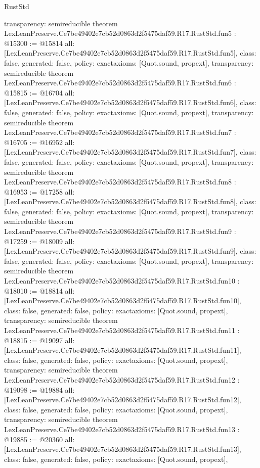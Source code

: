 \begin{lexlean}{RustStd}
\begin{coremodule}
{  transparency: semireducible
}
theorem LexLeanPreserve.Ce7be49402e7cb52d0863d2f5475daf59.R17.RustStd.fun5 : @15300 := @15814 {
  all: [LexLeanPreserve.Ce7be49402e7cb52d0863d2f5475daf59.R17.RustStd.fun5],
  class: false,
  generated: false,
  policy: exact{axioms: [Quot.sound, propext]},
  transparency: semireducible
}
theorem LexLeanPreserve.Ce7be49402e7cb52d0863d2f5475daf59.R17.RustStd.fun6 : @15815 := @16704 {
  all: [LexLeanPreserve.Ce7be49402e7cb52d0863d2f5475daf59.R17.RustStd.fun6],
  class: false,
  generated: false,
  policy: exact{axioms: [Quot.sound, propext]},
  transparency: semireducible
}
theorem LexLeanPreserve.Ce7be49402e7cb52d0863d2f5475daf59.R17.RustStd.fun7 : @16705 := @16952 {
  all: [LexLeanPreserve.Ce7be49402e7cb52d0863d2f5475daf59.R17.RustStd.fun7],
  class: false,
  generated: false,
  policy: exact{axioms: [Quot.sound, propext]},
  transparency: semireducible
}
theorem LexLeanPreserve.Ce7be49402e7cb52d0863d2f5475daf59.R17.RustStd.fun8 : @16953 := @17258 {
  all: [LexLeanPreserve.Ce7be49402e7cb52d0863d2f5475daf59.R17.RustStd.fun8],
  class: false,
  generated: false,
  policy: exact{axioms: [Quot.sound, propext]},
  transparency: semireducible
}
theorem LexLeanPreserve.Ce7be49402e7cb52d0863d2f5475daf59.R17.RustStd.fun9 : @17259 := @18009 {
  all: [LexLeanPreserve.Ce7be49402e7cb52d0863d2f5475daf59.R17.RustStd.fun9],
  class: false,
  generated: false,
  policy: exact{axioms: [Quot.sound, propext]},
  transparency: semireducible
}
theorem LexLeanPreserve.Ce7be49402e7cb52d0863d2f5475daf59.R17.RustStd.fun10 : @18010 := @18814 {
  all: [LexLeanPreserve.Ce7be49402e7cb52d0863d2f5475daf59.R17.RustStd.fun10],
  class: false,
  generated: false,
  policy: exact{axioms: [Quot.sound, propext]},
  transparency: semireducible
}
theorem LexLeanPreserve.Ce7be49402e7cb52d0863d2f5475daf59.R17.RustStd.fun11 : @18815 := @19097 {
  all: [LexLeanPreserve.Ce7be49402e7cb52d0863d2f5475daf59.R17.RustStd.fun11],
  class: false,
  generated: false,
  policy: exact{axioms: [Quot.sound, propext]},
  transparency: semireducible
}
theorem LexLeanPreserve.Ce7be49402e7cb52d0863d2f5475daf59.R17.RustStd.fun12 : @19098 := @19884 {
  all: [LexLeanPreserve.Ce7be49402e7cb52d0863d2f5475daf59.R17.RustStd.fun12],
  class: false,
  generated: false,
  policy: exact{axioms: [Quot.sound, propext]},
  transparency: semireducible
}
theorem LexLeanPreserve.Ce7be49402e7cb52d0863d2f5475daf59.R17.RustStd.fun13 : @19885 := @20360 {
  all: [LexLeanPreserve.Ce7be49402e7cb52d0863d2f5475daf59.R17.RustStd.fun13],
  class: false,
  generated: false,
  policy: exact{axioms: [Quot.sound, propext]},
}
\end{coremodule}
\end{lexlean}
